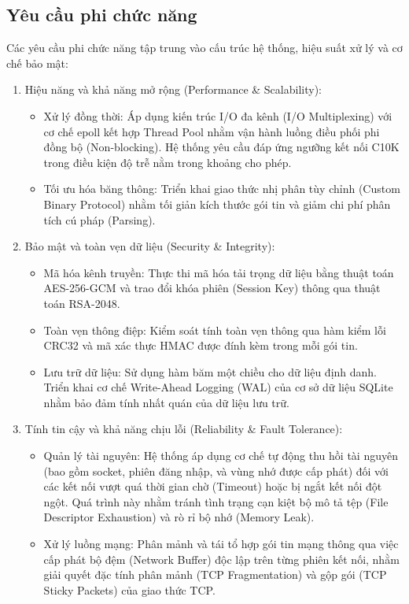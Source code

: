 \subsection{Yêu cầu phi chức năng}

Các yêu cầu phi chức năng tập trung vào cấu trúc hệ thống, hiệu suất xử lý và cơ chế bảo mật:

\begin{enumerate}
    \item Hiệu năng và khả năng mở rộng (Performance \& Scalability):
    \begin{itemize}[label={-}]
        \item Xử lý đồng thời: Áp dụng kiến trúc I/O đa kênh (I/O Multiplexing) với cơ chế epoll kết hợp Thread Pool nhằm vận hành luồng điều phối phi đồng bộ (Non-blocking). Hệ thống yêu cầu đáp ứng ngưỡng kết nối C10K trong điều kiện độ trễ nằm trong khoảng cho phép.
        \item Tối ưu hóa băng thông: Triển khai giao thức nhị phân tùy chỉnh (Custom Binary Protocol) nhằm tối giản kích thước gói tin và giảm chi phí phân tích cú pháp (Parsing).
    \end{itemize}

    \item Bảo mật và toàn vẹn dữ liệu (Security \& Integrity):
    \begin{itemize}[label={-}]
        \item Mã hóa kênh truyền: Thực thi mã hóa tải trọng dữ liệu bằng thuật toán AES-256-GCM và trao đổi khóa phiên (Session Key) thông qua thuật toán RSA-2048.
        \item Toàn vẹn thông điệp: Kiểm soát tính toàn vẹn thông qua hàm kiểm lỗi CRC32 và mã xác thực HMAC được đính kèm trong mỗi gói tin.
        \item Lưu trữ dữ liệu: Sử dụng hàm băm một chiều cho dữ liệu định danh. Triển khai cơ chế Write-Ahead Logging (WAL) của cơ sở dữ liệu SQLite nhằm bảo đảm tính nhất quán của dữ liệu lưu trữ.
    \end{itemize}

    \item Tính tin cậy và khả năng chịu lỗi (Reliability \& Fault Tolerance):
    \begin{itemize}[label={-}]
        \item Quản lý tài nguyên: Hệ thống áp dụng cơ chế tự động thu hồi tài nguyên (bao gồm socket, phiên đăng nhập, và vùng nhớ được cấp phát) đối với các kết nối vượt quá thời gian chờ (Timeout) hoặc bị ngắt kết nối đột ngột. Quá trình này nhằm tránh tình trạng cạn kiệt bộ mô tả tệp (File Descriptor Exhaustion) và rò rỉ bộ nhớ (Memory Leak).
        \item Xử lý luồng mạng: Phân mảnh và tái tổ hợp gói tin mạng thông qua việc cấp phát bộ đệm (Network Buffer) độc lập trên từng phiên kết nối, nhằm giải quyết đặc tính phân mảnh (TCP Fragmentation) và gộp gói (TCP Sticky Packets) của giao thức TCP.
    \end{itemize}
\end{enumerate}